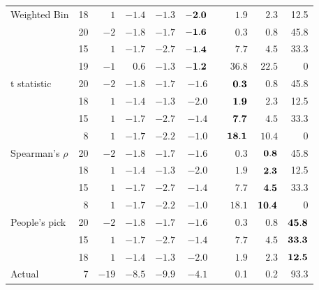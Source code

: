 \begin{table}[hbt]
\begin{tabular}{l r rrrr r rrr}
Weighted Bin & 18 & $1$ & $-1.4$ & $-1.3$ & $\bf -2.0$ & & $1.9$ & $2.3$ & 12.5 \\[-0.5ex]
		 & 20 & $-2$ & $-1.8$ & $-1.7$ & $\bf -1.6$ & & $0.3$ & $0.8$ & 45.8 \\[-0.5ex]
 		& 15 & $1$ & $-1.7$ & $-2.7$ & $\bf -1.4$ & & $7.7$ & $4.5$ & 33.3 \\[-0.5ex]
 		& 19 & $-1$ & $0.6$ & $-1.3$ & $\bf -1.2$ & & $36.8$ & $22.5$ & 0\\[1ex]

t statistic  & 20 & $-2$ & $-1.8$ & $-1.7$ & $ -1.6$ & & $\bf 0.3$ & $0.8$ & 45.8 \\[-0.5ex]
		  & 18 & $1$ & $-1.4$ & $-1.3$ & $ -2.0$ & & $\bf 1.9$ & $2.3$ & 12.5\\[-0.5ex]
		& 15 & $1$ & $-1.7$ & $-2.7$ & $ -1.4$ & & $\bf 7.7$ & $4.5$ & 33.3 \\[-0.5ex]
 		 & 8 & $ 1$ & $-1.7$ & $-2.2$ & $-1.0$ & & $\bf18.1$ & $10.4$ & 0 \\[1ex]

Spearman's $\rho$  & 20 & $-2$ & $-1.8$ & $-1.7$ & $ -1.6$ & & $0.3$ & $\bf 0.8$ & 45.8 \\[-0.5ex]
		   & 18 & $1$ & $-1.4$ & $-1.3$ & $ -2.0$ & & $1.9$ & $\bf 2.3$ & 12.5 \\[-0.5ex]
		 & 15 & $1$ & $-1.7$ & $-2.7$ & $ -1.4$ & & $7.7$ & $\bf 4.5$ & 33.3 \\[-0.5ex]
 		 & 8 & $ 1$ & $-1.7$ & $-2.2$ & $-1.0$ & & $18.1$ & $\bf 10.4$ & 0\\[1ex]

People's pick  	& 20 & $-2$ & $-1.8$ & $-1.7$ & $ -1.6$ & & $0.3$ & $0.8$ & $\bf 45.8$ \\[-0.5ex]  
		 & 15 & $1$ & $-1.7$ & $-2.7$ & $ -1.4$ & & $7.7$ & $4.5$ & $\bf 33.3$ \\[-0.5ex]
		  & 18 & $1$ & $-1.4$ & $-1.3$ & $ -2.0$ & & $1.9$ & $2.3$ & $\bf 12.5$ \\[1ex]

\hline
Actual & 7  & $-19$ & $-8.5$ & $-9.9$ & $-4.1$ & & 0.1 & 0.2 & 93.3\\[1ex]
\hline
\end{tabular}
\label{sca_table}
\end{table}


